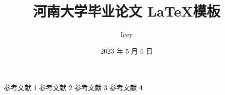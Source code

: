 \documentclass{HENU-Bachelor-LaTeX}
\begin{document}

\title{河南大学毕业论文 \LaTeX 模板}            %
\author{Icey}                     %
\date{2023 年 5 月 6 日}          %

\maketitle
\frontmatter
{}            %

\thispagestyle{empty}
\tableofcontents
\thispagestyle{empty}

\mainmatter %
 
 
 
%
\appendix
\cleardoublepage{}

%

\begin{thebibliography}{99}
   参考文献 1
   参考文献 2
   参考文献 3
   参考文献 4
\end{thebibliography}

\cleardoublepage
\end{document}
